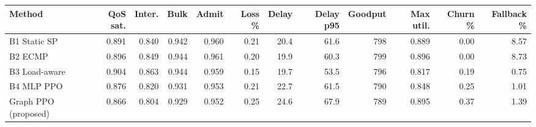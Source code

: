 \begin{tabular}{lrrrrrrrrrrr}
\toprule
Method & QoS sat. & Inter. & Bulk & Admit & Loss \% & Delay & Delay p95 & Goodput & Max util. & Churn \% & Fallback \% \\
\midrule
B1 Static SP & 0.891 & 0.840 & 0.942 & 0.960 & 0.21 & 20.4 & 61.6 & 798 & 0.889 & 0.00 & 8.57 \\
B2 ECMP & 0.896 & 0.849 & 0.944 & 0.961 & 0.20 & 19.9 & 60.3 & 799 & 0.896 & 0.00 & 8.73 \\
B3 Load-aware & 0.904 & 0.863 & 0.944 & 0.959 & 0.15 & 19.7 & 53.5 & 796 & 0.817 & 0.19 & 0.75 \\
B4 MLP PPO & 0.876 & 0.820 & 0.931 & 0.953 & 0.21 & 22.7 & 61.5 & 790 & 0.848 & 0.25 & 1.01 \\
Graph PPO (proposed) & 0.866 & 0.804 & 0.929 & 0.952 & 0.25 & 24.6 & 67.9 & 789 & 0.895 & 0.37 & 1.39 \\
\bottomrule
\end{tabular}